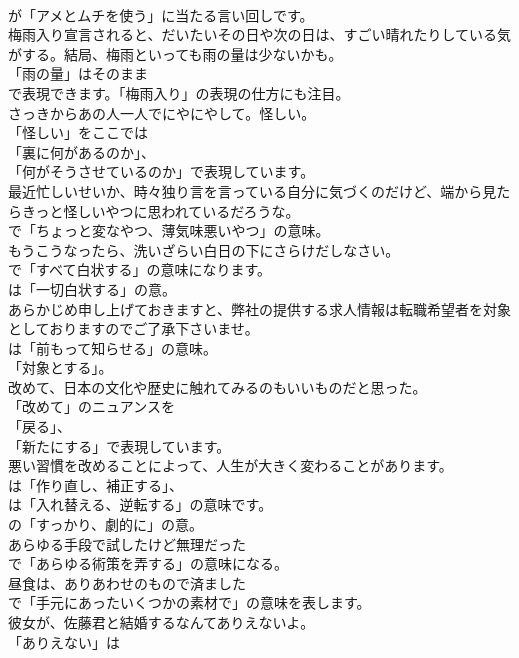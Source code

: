 \documentclass[8pt]{extreport}
\begin{document}
\begin{CJK}{UTF8}{min}
\\	が「アメとムチを使う」に当たる言い回しです。	
\\	梅雨入り宣言されると、だいたいその日や次の日は、すごい晴れたりしている気がする。結局、梅雨といっても雨の量は少ないかも。 
\\	「雨の量」はそのまま 
\\	で表現できます。「梅雨入り」の表現の仕方にも注目。	
\\	さっきからあの人一人でにやにやして。怪しい。 
\\	「怪しい」をここでは
\\	「裏に何があるのか」、
\\	「何がそうさせているのか」で表現しています。	
\\	最近忙しいせいか、時々独り言を言っている自分に気づくのだけど、端から見たらきっと怪しいやつに思われているだろうな。 
\\	で「ちょっと変なやつ、薄気味悪いやつ」の意味。	
\\	もうこうなったら、洗いざらい白日の下にさらけだしなさい。 
\\	で「すべて白状する」の意味になります。
\\	は「一切白状する」の意。	
\\	あらかじめ申し上げておきますと、弊社の提供する求人情報は転職希望者を対象としておりますのでご了承下さいませ。 
\\	は「前もって知らせる」の意味。
\\	「対象とする」。	
\\	改めて、日本の文化や歴史に触れてみるのもいいものだと思った。 
\\	「改めて」のニュアンスを
\\	「戻る」、
\\	「新たにする」で表現しています。	
\\	悪い習慣を改めることによって、人生が大きく変わることがあります。 
\\	は「作り直し、補正する」、
\\	は「入れ替える、逆転する」の意味です。
\\	の「すっかり、劇的に」の意。	
\\	あらゆる手段で試したけど無理だった 
\\	で「あらゆる術策を弄する」の意味になる。	
\\	昼食は、ありあわせのもので済ました 
\\	で「手元にあったいくつかの素材で」の意味を表します。	
\\	彼女が、佐藤君と結婚するなんてありえないよ。 
\\	「ありえない」は

\end{CJK}
\end{document}
